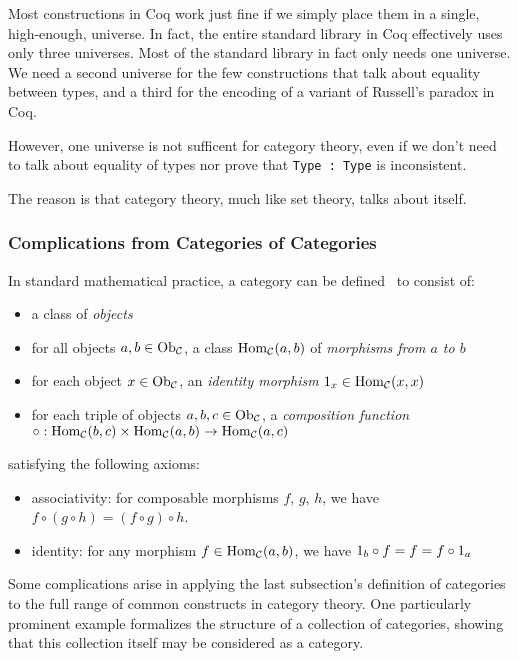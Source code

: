 Most constructions in Coq work just fine if we simply place them in a single, high-enough, universe.
In fact, the entire standard library in Coq effectively uses only three universes.
Most of the standard library in fact only needs one universe.
We need a second universe for the few constructions that talk about equality between types, and a third for the encoding of a variant of Russell's paradox in Coq.

However, one universe is not sufficent for category theory, even if we don't need to talk about equality of types nor prove that \texttt{Type : Type} is inconsistent.

The reason is that category theory, much like set theory, talks about itself.

\subsubsection{Complications from Categories of Categories}\label{sec:category-def}\label{sec:category-of-categories}

In standard mathematical practice, a category  can be defined~\cite{awodey2010category} to consist of:
\begin{itemize}
  \item
    a class \Ob[C] of \emph{objects}
  \item
    for all objects $a, b \in \Ob[C]$, a class $\Hom[C](a, b)$ of \emph{morphisms from $a$ to $b$}
  \item
    for each object $x \in \Ob[C]$, an \emph{identity morphism} $\Id[x] \in \Hom[C](x, x)$
  \item
    for each triple of objects $a, b, c \in \Ob[C]$, a \emph{composition function} $\circ : \Hom[C](b, c) \times \Hom[C](a, b) \to \Hom[C](a, c)$
\end{itemize}
satisfying the following axioms:
\begin{itemize}
  \item
    associativity: for composable morphisms $f$, $g$, $h$, we have $f \circ (g \circ h) = (f \circ g) \circ h$.
  \item
    identity: for any morphism $f \in \Hom[C](a, b)$, we have $\Id[b] \circ f = f = f \circ \Id[a]$
\end{itemize}

Some complications arise in applying the last subsection's definition of categories to the full range of common constructs in category theory.
One particularly prominent example formalizes the structure of a collection of categories, showing that this collection itself may be considered as a category.


